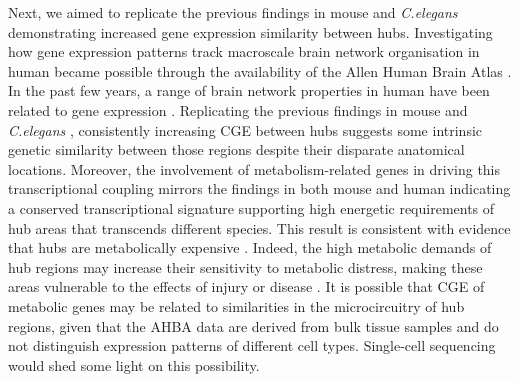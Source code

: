 Next, we aimed to replicate the previous findings in mouse \citep{Fulcher2016} and \textit{C.elegans} \citep{Arnatkeviciute2018} demonstrating increased gene expression similarity between hubs. Investigating how gene expression patterns track macroscale brain network organisation in human became possible through the availability of the Allen Human Brain Atlas \citep{Hawrylycz2012}. In the past few years, a range of brain network properties in human have been related to gene expression \citep{Cioli2014b,Forest2017,Goel2014,Richiardi2015,Vertes2016b}. Replicating the previous findings in mouse \citep{Fulcher2016} and \textit{C.elegans} \citep{Arnatkeviciute2018}, consistently increasing CGE between hubs suggests some intrinsic genetic similarity between those regions despite their disparate anatomical locations. Moreover, the involvement of metabolism-related genes in driving this transcriptional coupling mirrors the findings in both mouse \citep{Fulcher2016} and human \citep{Vertes2016b} indicating a conserved transcriptional signature supporting high energetic requirements of hub areas \citep{Liang2013a,Tomasi2013} that transcends different species. This result is consistent with evidence that hubs are metabolically expensive \citep{Vaishnavi2010,Varkuti2011}. Indeed, the high metabolic demands of hub regions may increase their sensitivity to metabolic distress, making these areas vulnerable to the effects of injury or disease \citep{Crossley2014,Fornito2015}. It is possible that CGE of metabolic genes may be related to similarities in the microcircuitry of hub regions, given that the AHBA data are derived from bulk tissue samples and do not distinguish expression patterns of different cell types. Single-cell sequencing \citep{Lein2017} would shed some light on this possibility.

